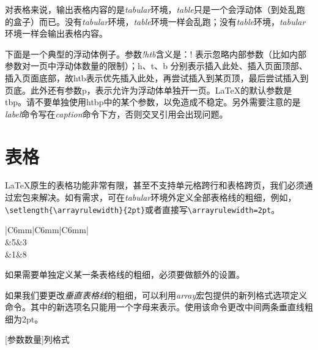 对表格来说，输出表格内容的是\emph{tabular}环境，\emph{table}只是一个会浮动体（到处乱跑的盒子）而已。没有\emph{tabular}环境，\emph{table}环境一样会乱跑；没有\emph{table}环境，\emph{tabular}环境一样会输出表格内容。

下面是一个典型的浮动体例子。参数\emph{!htb}含义是：! 表示忽略内部参数（比如内部参数对一页中浮动体数量的限制）；h、t、b 分别表示插入此处、插入页面顶部、插入页面底部，故htb表示优先插入此处，再尝试插入到某页顶，最后尝试插入到页底。此外还有参数p，表示允许为浮动体单独开一页。\LaTeX 的默认参数是tbp。请不要单独使用htbp中的某个参数，以免造成不稳定。另外需要注意的是\emph{label}命令写在\emph{caption}命令下方，否则交叉引用会出现问题。


\section{表格}
\LaTeX 原生的表格功能非常有限，甚至不支持单元格跨行和表格跨页，我们必须通过宏包来解决。如有需求，可在\emph{tabular}环境外定义全部表格线的粗细，例如，\verb|\setlength{\arrayrulewidth}{2pt}|或者直接写\verb|\arrayrulewidth=2pt|。

\begin{codeshow}
\centering
\arrayrulewidth=1pt%
\begin{tabular}
	{|C{6mm}|C{6mm}|C{6mm}|}
	\hline
	\\
	&5&3\\
	&1&8\\
	\hline
\end{tabular}
\end{codeshow}

如果需要单独定义某一条表格线的粗细，必须要做额外的设置。

如果我们要更改\emph{垂直表格线}的粗细，可以利用\emph{array}宏包提供的新列格式选项定义命令。其中的新选项名只能用一个字母来表示。使用该命令更改中间两条垂直线粗细为2pt。

\begin{latex}
\newcolumntype{新选项名称}[参数数量]{列格式}
\end{latex}

